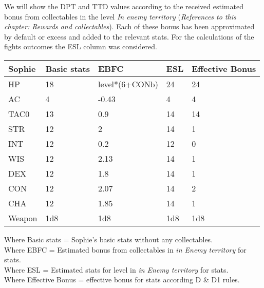 We will show the DPT and TTD values according to the received estimated bonus from collectables in the level \textit{In enemy territory} (\textit{References to this chapter: Rewards and collectables}). Each of these bonus has been approximated by default or excess and added to the relevant stats. For the calculations of the fights outcomes the ESL column was considered.
\begin{table}[H]
  \centering
\begin{tabular}{|l|l|l|l|l|}
\hline
\rowcolor[HTML]{C0C0C0} 
\textbf{Sophie} & \textbf{Basic stats} & \textbf{EBFC} & \textbf{ESL} & \textbf{Effective Bonus} \\ \hline
HP & 18 & level*(6+CONb) & 24 & 24 \\ \hline
AC & 4 & -0.43 & 4 & 4 \\ \hline
TAC0 & 13 & 0.9 & 14 & 14 \\ \hline
STR & 12 & 2 & 14 & 1 \\ \hline
INT & 12 & 0.2 & 12 & 0 \\ \hline
WIS & 12 & 2.13 & 14 & 1 \\ \hline
DEX & 12 & 1.8 & 14 & 1 \\ \hline
CON & 12 & 2.07 & 14 & 2 \\ \hline
CHA & 12 & 1.85 & 14 & 1 \\ \hline
Weapon & 1d8 & 1d8 & 1d8 & 1d8 \\ \hline
\end{tabular}
\end{table}
Where Basic stats = Sophie's basic stats without any collectables.\\
Where EBFC = Estimated bonus from collectables in \textit{in Enemy territory} for stats. \\
Where ESL = Estimated stats for level in \textit{in Enemy territory} for stats.\\
Where Effective Bonus = effective bonus for stats according D \& D1 rules.\\

